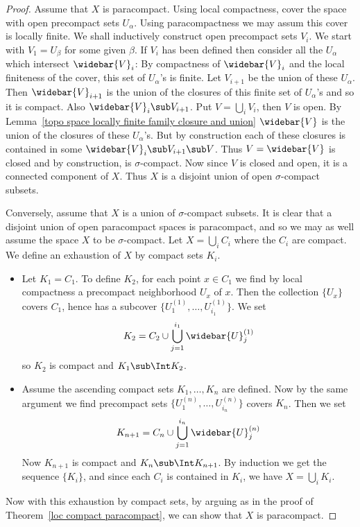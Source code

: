 \begin{proof}
Assume that $X$ is paracompact. Using local compactness, cover the space with open precompact sets $U_\alpha$. Using paracompactness we may assum this cover is locally finite. We shall inductively construct open precompact sets $V_i$. We start with $V_1=U_\beta$ for some given $\beta$. If $V_i$ has been defined then consider all the $U_\alpha$ which intersect $\widebar{V}_i$: By compactness of $\widebar{V}_i$ and the local finiteness of the cover, this set of $U_\alpha$'s is finite. Let $V_{i+1}$ be the union of these $U_\alpha$. Then $\widebar{V}_{i+1}$ is the union of the closures of this finite set of $U_\alpha$'s and so it is compact. Also $\widebar{V}_i\sub V_{i+1}$. Put $V=\bigcup_iV_i$, then $V$ is open. By Lemma~\ref{topo space locally finite family closure and union} $\widebar{V}$ is the union of the closures of these $U_\alpha$'s. But by construction each of these closures is contained in some $\widebar{V}_i\sub V_{i+1}\sub V$. Thus $V=\widebar{V}$ is closed and by construction, is $\sigma$-compact. Now since $V$ is closed and open, it is a connected component of $X$. Thus $X$ is a disjoint union of open $\sigma$-compact subsets.\par
Conversely, assume that $X$ is a union of $\sigma$-compact subsets. It is clear that a disjoint union of open paracompact spaces is paracompact, and so we may as well assume the space $X$ to be $\sigma$-compact. Let $X=\bigcup_iC_i$ where the $C_i$ are compact. We define an exhaustion of $X$ by compact sets $K_i$.
\begin{itemize}
\item Let $K_1=C_1$. To define $K_2$, for each point $x\in C_1$ we find by local compactness a precompact neighborhood $U_x$ of $x$. Then the collection $\{U_x\}$ covers $C_1$, hence has a subcover $\{U^{(1)}_{1},\dots,U^{(1)}_{i_1}\}$. We set
\[K_2=C_2\cup\bigcup_{j=1}^{i_1}\widebar{U}^{(1)}_j\]
so $K_2$ is compact and $K_1\sub\Int K_2$.
\item Assume the ascending compact sets $K_1,\dots,K_n$ are defined. Now by the same argument we find precompact sets $\{U^{(n)}_1,\dots,U^{(n)}_{i_n}\}$ covers $K_n$. Then we set
\[K_{n+1}=C_n\cup\bigcup_{j=1}^{i_n}\widebar{U}_j^{(n)}\] 
Now $K_{n+1}$ is compact and $K_n\sub\Int K_{n+1}$. By induction we get the sequence $\{K_i\}$, and since each $C_i$ is contained in $K_i$, we have $X=\bigcup_iK_i$.
\end{itemize}
Now with this exhaustion by compact sets, by arguing as in the proof of Theorem~\ref{loc compact paracompact}, we can show that $X$ is paracompact.
\end{proof}
